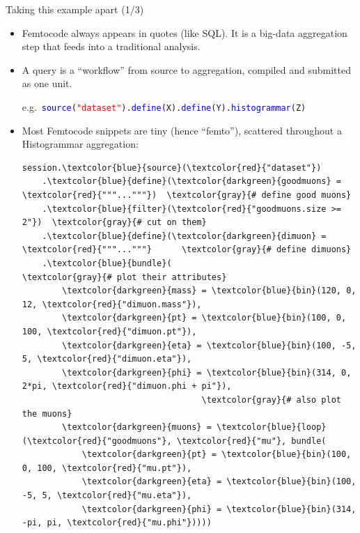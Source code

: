 \documentclass{beamer}
\begin{document}
\begin{frame}[fragile]{Taking this example apart (1/3)}
\vspace{0.25 cm}
\begin{itemize}
\item Femtocode always appears in quotes (like SQL). It is a big-data aggregation step that feeds into a traditional analysis.

\item A query is a ``workflow'' from source to aggregation, compiled and submitted as one unit.

e.g.\ {\tt\scriptsize \textcolor{blue}{source}(\textcolor{red}{"dataset"}).\textcolor{blue}{define}(X).\textcolor{blue}{define}(Y).\textcolor{blue}{histogrammar}(Z) }

\item Most Femtocode snippets are tiny (hence ``femto''), scattered throughout a Histogrammar aggregation:

\scriptsize
\begin{Verbatim}[commandchars=\\\{\}]
session.\textcolor{blue}{source}(\textcolor{red}{"dataset"})
    .\textcolor{blue}{define}(\textcolor{darkgreen}{goodmuons} = \textcolor{red}{"""..."""})  \textcolor{gray}{# define good muons}
    .\textcolor{blue}{filter}(\textcolor{red}{"goodmuons.size >= 2"})  \textcolor{gray}{# cut on them}
    .\textcolor{blue}{define}(\textcolor{darkgreen}{dimuon} = \textcolor{red}{"""..."""}      \textcolor{gray}{# define dimuons}
    .\textcolor{blue}{bundle}(                        \textcolor{gray}{# plot their attributes}
        \textcolor{darkgreen}{mass} = \textcolor{blue}{bin}(120, 0, 12, \textcolor{red}{"dimuon.mass"}),
        \textcolor{darkgreen}{pt} = \textcolor{blue}{bin}(100, 0, 100, \textcolor{red}{"dimuon.pt"}),
        \textcolor{darkgreen}{eta} = \textcolor{blue}{bin}(100, -5, 5, \textcolor{red}{"dimuon.eta"}),
        \textcolor{darkgreen}{phi} = \textcolor{blue}{bin}(314, 0, 2*pi, \textcolor{red}{"dimuon.phi + pi"}),
                                    \textcolor{gray}{# also plot the muons}
        \textcolor{darkgreen}{muons} = \textcolor{blue}{loop}(\textcolor{red}{"goodmuons"}, \textcolor{red}{"mu"}, bundle(
            \textcolor{darkgreen}{pt} = \textcolor{blue}{bin}(100, 0, 100, \textcolor{red}{"mu.pt"}),
            \textcolor{darkgreen}{eta} = \textcolor{blue}{bin}(100, -5, 5, \textcolor{red}{"mu.eta"}),
            \textcolor{darkgreen}{phi} = \textcolor{blue}{bin}(314, -pi, pi, \textcolor{red}{"mu.phi"}))))
\end{Verbatim}
\end{itemize}
\end{frame}
\end{document}
